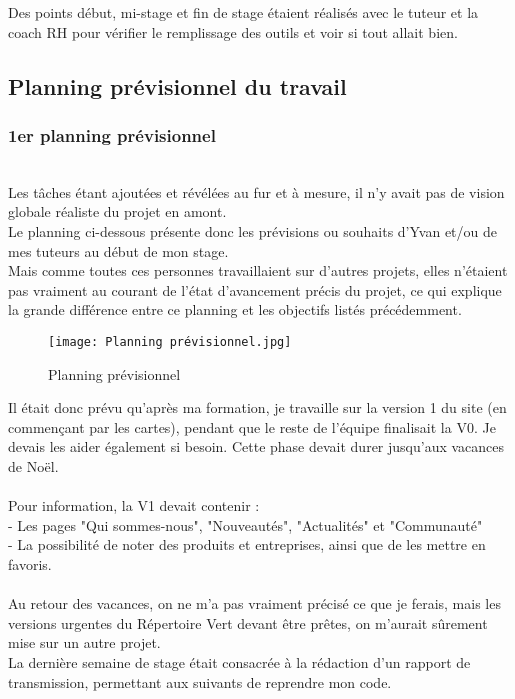 Des points début, mi-stage et fin de stage étaient réalisés avec le tuteur et la coach RH pour vérifier le remplissage des outils et voir si tout allait bien.


\pagebreak
\subsection{Planning prévisionnel du travail}

\subsubsection{1er planning prévisionnel}
~\\

Les tâches étant ajoutées et révélées au fur et à mesure, il n'y avait pas de vision globale réaliste du projet en amont.\\
Le planning ci-dessous présente donc les prévisions ou souhaits d'Yvan et/ou de mes tuteurs au début de mon stage.\\ 
Mais comme toutes ces personnes travaillaient sur d'autres projets, elles n'étaient pas vraiment au courant de l'état d'avancement précis du projet, ce qui explique la grande différence entre ce planning et les objectifs listés précédemment.

\begin{figure}[H]
    \centering
    \texttt{[image: Planning prévisionnel.jpg]}
    \caption{Planning prévisionnel}
\end{figure}

Il était donc prévu qu'après ma formation, je travaille sur la version 1 du site (en commençant par les cartes), 
pendant que le reste de l'équipe finalisait la V0. Je devais les aider également si besoin. Cette phase devait durer jusqu'aux vacances de Noël.
\\\\Pour information, la V1 devait contenir : \\
- Les pages "Qui sommes-nous", "Nouveautés", "Actualités" et "Communauté"\\
- La possibilité de noter des produits et entreprises, ainsi que de les mettre en favoris.
\\\\
Au retour des vacances, on ne m'a pas vraiment précisé ce que je ferais, mais les versions urgentes du Répertoire Vert devant être prêtes, on m'aurait sûrement mise sur un autre projet.
\\
La dernière semaine de stage était consacrée à la rédaction d'un rapport de transmission, permettant aux suivants de reprendre mon code.

